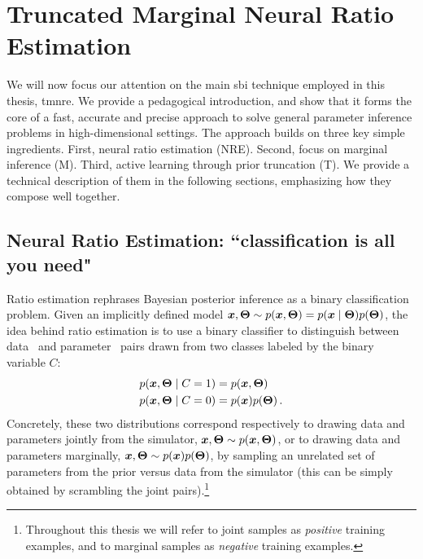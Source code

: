 \section{Truncated Marginal Neural Ratio Estimation} \label{sec:tmnre}

We will now focus our attention on the main \gls*{sbi} technique employed in this thesis, \gls*{tmnre}. We provide a pedagogical introduction, and show that it forms the core of a fast, accurate and precise approach to solve general parameter inference problems in high-dimensional settings. The approach builds on three key simple ingredients. First, neural ratio estimation (NRE). Second, focus on marginal inference (M).  Third, active learning through prior truncation (T).  We provide a technical description of them in the following sections, emphasizing how they compose well together.

\subsection{Neural Ratio Estimation: ``classification is all you need"} \label{subsec:tmnre-nre}

 Ratio estimation rephrases Bayesian posterior inference as a binary classification problem.
Given an implicitly defined model $\bm{x}, \bm{\Theta} \sim p(\bm{x}, \bm{\Theta}) = p(\bm{x}\mid\bm{\Theta})p(\bm{\Theta})$, the idea behind ratio estimation is to use a binary classifier to distinguish between data \data\ and parameter \param\ pairs  drawn from two classes labeled by the binary variable $C$:
\begin{align}
    p(\bm{x}, \bm{\Theta}  \mid C = 1) &= p(\bm{x}, \bm{\Theta} ) \\
    p(\bm{x}, \bm{\Theta}  \mid C = 0) &= p(\bm{x}) p(\bm{\Theta} ) \, .
\end{align}
Concretely, these two distributions correspond respectively to drawing data and parameters jointly from the simulator, $\bm{x}, \bm{\Theta} \sim p(\bm{x}, \bm{\Theta})$, or to drawing data and parameters marginally, $\bm{x}, \bm{\Theta} \sim p(\bm{x}) p(\bm{\Theta})$, by sampling an unrelated set of parameters from the prior versus data from the simulator (this can be simply obtained by scrambling the joint pairs).\footnote{Throughout this thesis we will refer to joint samples as \emph{positive} training examples, and to marginal samples as \emph{negative} training examples.} 

